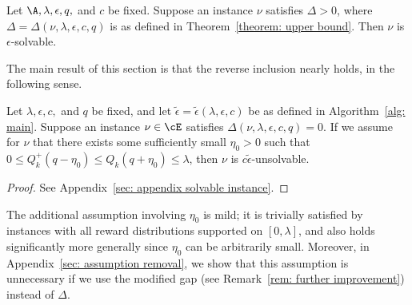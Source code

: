 \begin{corollary}
\label{cor: positive gap is solvable}
    Let $\A, \lambda, \epsilon, q,$ and $c$ be fixed. 
    Suppose an instance $\nu$ satisfies
    $ \Delta > 0$, where $\Delta =  \Delta(\nu, \lambda, \epsilon, c, q) $ is as defined in Theorem~\ref{theorem: upper bound}.
    Then $\nu$ is $\epsilon$-solvable. 
\end{corollary}
The main result of this section is that the reverse inclusion nearly holds, in the following sense.
 \begin{theorem}
 \label{thm: zero gap is unsolvable}
    Let $\lambda, \epsilon, c,$ and $q$ be fixed, 
    and let $\tilde{\epsilon} = \tilde{\epsilon}(\lambda, \epsilon, c)$ be as defined in 
    Algorithm~\ref{alg: main}.
    Suppose an instance $\nu \in \cE$ satisfies $\Delta(\nu, \lambda, \epsilon, c, q) = 0$.
    If we assume for $\nu$ that there exists some sufficiently small $\eta_0 > 0$ such that 
    $0 \le Q_k^+(q-\eta_0) \le Q_k(q+\eta_0) \le \lambda$, then $\nu$ is $c\tilde{\epsilon}$-unsolvable.
 \end{theorem}
\begin{proof}
    See Appendix~\ref{sec: appendix solvable instance}.
\end{proof}


\begin{remark}
\label{rem: remove additional assumption}
    The additional assumption involving $\eta_0$ 
    is mild; it is trivially satisfied by instances with all reward distributions supported on $[0, \lambda]$, and also holds significantly more generally since $\eta_0$ can be arbitrarily small.
    Moreover, in Appendix~\ref{sec: assumption removal}, we show that
    this assumption is unnecessary if we use the modified gap (see Remark~\ref{rem: further improvement}) instead of $\Delta$.
\end{remark}


